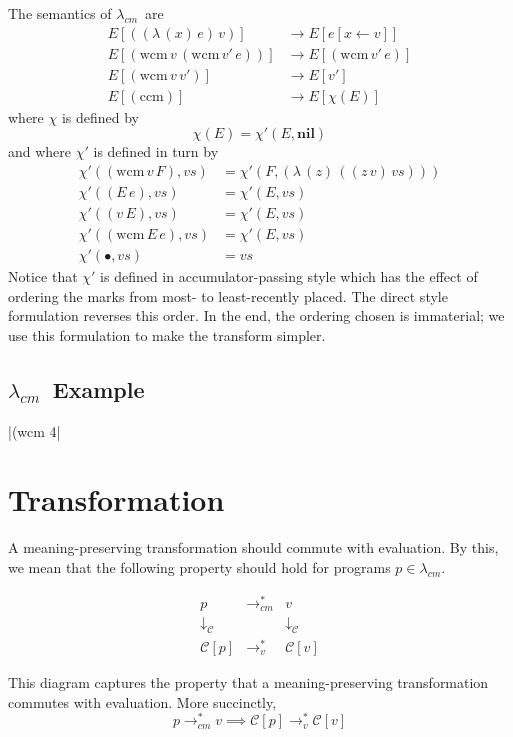 \documentclass{llncs}
\newcommand{\cm}[0]{$\lambda_{cm}$}
\newcommand{\wcm}[2]{(\mathrm{wcm}\,#1\,#2)}
\newcommand{\ccm}[0]{(\mathrm{ccm})}
\newcommand{\app}[2]{(#1\,#2)}
\newcommand{\abs}[2]{(\lambda\,(#1)\,#2)}
\newcommand{\hole}[0]{\bullet}
\newcommand{\rr}[0]{\rightarrow}
\newcommand{\lvrrs}[0]{\rightarrow_v^{*}}
\newcommand{\cmrrs}[0]{\rightarrow_{cm}^{*}}
\newcommand{\C}[1]{\mathcal{C}[#1]}
\begin{document}
The semantics of \cm\ are
\begin{align}
E[\app{\abs{x}{e}}{v}]  &\rr E[e[x\leftarrow v]]\\
E[\wcm{v}{\wcm{v'}{e}}] &\rr E[\wcm{v'}{e}]\\
E[\wcm{v}{v'}]          &\rr E[v']\\
E[\ccm]                 &\rr E[\chi(E)]
\end{align}
where $\chi$ is defined by
\begin{equation}
\chi(E)=\chi'(E,\mathbf{nil})
\end{equation}
and where $\chi'$ is defined in turn by
\begin{align}
\chi'(\wcm{v}{F},vs) &= \chi'(F,\abs{z}{\app{\app{z}{v}}{vs}})\\
\chi'(\app{E}{e},vs) &= \chi'(E,vs)\\
\chi'(\app{v}{E},vs) &= \chi'(E,vs)\\
\chi'(\wcm{E}{e},vs) &= \chi'(E,vs)\\
\chi'(\hole,vs)      &= vs
\end{align}
Notice that $\chi'$ is defined in accumulator-passing style which has the effect of ordering the marks from most- to least-recently placed. The direct style formulation reverses this order. In the end, the ordering chosen is immaterial; we use this formulation to make the transform simpler.

\subsection{\cm\ Example}

\scheme|(wcm 4|

\section{Transformation}

A meaning-preserving transformation should commute with evaluation. By this, we mean that the following property should hold for programs $p\in\lambda_{cm}$.

\[
\begin{array}{ccc}
p & \cmrrs & v\\
\downarrow_\mathcal{C} & & \downarrow_\mathcal{C}\\
\C{p} & \lvrrs & \C{v}
\end{array}
\]

This diagram captures the property that a meaning-preserving transformation commutes with evaluation. More succinctly, 
\begin{equation}
\label{meaning-preservation-property}
p\cmrrs v\implies\C{p}\lvrrs\C{v}
\end{equation}
\end{document}
